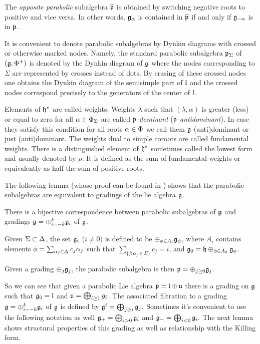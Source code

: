 The \emph{opposite parabolic} subalgebra $\overline{\mathfrak{p}}$  is obtained by switching negative roots to positive and vice versa. In other words, $\mathfrak{g}_\alpha$ is contained in $\overline{\mathfrak{p}}$ if and only if $\mathfrak{g}_{-\alpha}$ is in $\mathfrak{p}$.

It is convenient to denote parabolic subalgebras by Dynkin diagrams with crossed or otherwise marked nodes. Namely, the standard parabolic subalgebra $\mathfrak{p}_\Sigma$ of $(\mathfrak{g},\Phi^+)$ is denoted by the Dynkin diagram of $\mathfrak{g}$ where the nodes corresponding to $\Sigma$ are represented by crosses instead of dots. By erasing of these crossed nodes one obtains the Dynkin diagram of the semisimple part of $\mathfrak{l}$ and the crossed nodes correspond precisely to the generators of the center of $\mathfrak{l}$.


Elements of $\mathfrak{h}^*$ are called weights. Weights $\lambda$ such that $(\lambda, \alpha)$ is greater (less) or equal to zero for all $\alpha \in \Phi_\Sigma$ are called \emph{$\mathfrak{p}$-dominant} ($\mathfrak{p}$-\emph{antidominant}). In case they satisfy this condition for all roots $\alpha \in \Phi$ we call them $\mathfrak{g}$-(anti)dominant or just (anti)dominant. The weights dual to simple coroots are called fundamental weights. There is a distinguished element of $\mathfrak{h}^*$ sometimes called the lowest form and usually denoted by $\rho$. It is defined as the sum of fundamental weights or equivalently as half the sum of positive roots. 

The following lemma (whose proof can be found in \cite{cap_parabolic_2009}) shows that the parabolic subalgebras are equivalent to gradings of the lie algebra $\mathfrak{g}$.
\begin{lemma}
There is a bijective correspondence between parabolic subalgebras of $\mathfrak{g}$ and gradings $\mathfrak{g}=\oplus_{i=-k}^k \mathfrak{g}_i$ of $\mathfrak{g}$.

	Given $\Sigma\subset\Delta$, the set $\mathfrak{g}_i$ ($i\neq 0)$ is defined to be $\oplus_{\phi\in A_i} \mathfrak{g}_\phi$, where $A_i$ contains elements $\phi=\sum_{\alpha_j\in\Delta} c_j \alpha_j$ such that $\sum_{\{j:\alpha_j\in\Sigma\}} c_j=i$, and $\mathfrak{g}_0=\mathfrak{h}\oplus_{\phi\in A_0} \mathfrak{g}_\phi$.

	Given a grading $\oplus_j \mathfrak{g}_j$, the parabolic subalgebra is then $\mathfrak{p}=\oplus_{j\geq 0}\mathfrak{g}_j$.
\end{lemma}

So we can see that given a parabolic Lie algebra $\mathfrak{p} = \mathfrak{l} \oplus \mathfrak{u}$ there is a grading on $\mathfrak{g}$ such that $\mathfrak{g}_0 = \mathfrak{l}$ and $\mathfrak{u} = \bigoplus_{i \geq 1} g_i$. The associated filtration to a grading $\mathfrak{g}=\oplus_{i=-k}^k \mathfrak{g}_i$ of $\mathfrak{g}$ is defined by $\mathfrak{g}^i = \bigoplus_{j \geq i} \mathfrak{g}_j.$ Sometimes it's convenient to use the following notation as well $\mathfrak{g}_+ = \bigoplus_{i > 0} \mathfrak{g}_i$ and $\mathfrak{g}_- = \bigoplus_{i < 0} \mathfrak{g}_i.$ The next lemma shows structural properties of this grading as well as relationship with the Killing form.


